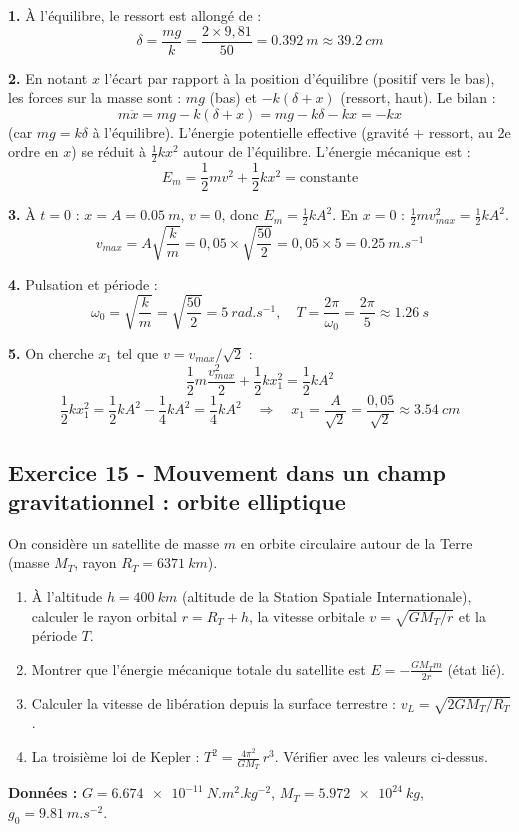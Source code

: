 \documentclass[12pt,a4paper]{article}
\begin{document}
\begin{boitecorrige}
\textbf{1.} À l'équilibre, le ressort est allongé de :
\[
\delta = \frac{mg}{k} = \frac{2\times9{,}81}{50} = \qty{0.392}{m} \approx \qty{39.2}{cm}
\]

\textbf{2.} En notant $x$ l'écart par rapport à la position d'équilibre (positif vers le bas), les forces sur la masse sont : $mg$ (bas) et $-k(\delta+x)$ (ressort, haut). Le bilan :
\[
m\ddot{x} = mg - k(\delta+x) = mg - k\delta - kx = -kx
\]
(car $mg = k\delta$ à l'équilibre). L'énergie potentielle effective (gravité + ressort, au 2e ordre en $x$) se réduit à $\frac{1}{2}kx^2$ autour de l'équilibre. L'énergie mécanique est :
\[
E_m = \frac{1}{2}mv^2 + \frac{1}{2}kx^2 = \text{constante}
\]

\textbf{3.} À $t=0$ : $x = A = \qty{0.05}{m}$, $v = 0$, donc $E_m = \frac{1}{2}kA^2$.
En $x = 0$ : $\frac{1}{2}mv_{max}^2 = \frac{1}{2}kA^2$.
\[
v_{max} = A\sqrt{\frac{k}{m}} = 0{,}05\times\sqrt{\frac{50}{2}} = 0{,}05\times5 = \qty{0.25}{m.s^{-1}}
\]

\textbf{4.} Pulsation et période :
\[
\omega_0 = \sqrt{\frac{k}{m}} = \sqrt{\frac{50}{2}} = \qty{5}{rad.s^{-1}}, \quad T = \frac{2\pi}{\omega_0} = \frac{2\pi}{5} \approx \qty{1.26}{s}
\]

\textbf{5.} On cherche $x_1$ tel que $v = v_{max}/\sqrt{2}$ :
\[
\frac{1}{2}m\frac{v_{max}^2}{2} + \frac{1}{2}kx_1^2 = \frac{1}{2}kA^2
\]
\[
\frac{1}{2}kx_1^2 = \frac{1}{2}kA^2 - \frac{1}{4}kA^2 = \frac{1}{4}kA^2 \quad \Rightarrow \quad x_1 = \frac{A}{\sqrt{2}} = \frac{0{,}05}{\sqrt{2}} \approx \qty{3.54}{cm}
\]
\end{boitecorrige}

\subsection*{Exercice 15 - Mouvement dans un champ gravitationnel : orbite elliptique \niveau{\difficile}}

\begin{boiteexercice}
On considère un satellite de masse $m$ en orbite circulaire autour de la Terre (masse $M_T$, rayon $R_T = \qty{6371}{km}$).
\begin{enumerate}
  \item À l'altitude $h = \qty{400}{km}$ (altitude de la Station Spatiale Internationale), calculer le rayon orbital $r = R_T + h$, la vitesse orbitale $v = \sqrt{GM_T/r}$ et la période $T$.
  \item Montrer que l'énergie mécanique totale du satellite est $E = -\frac{GM_T m}{2r}$ (état lié).
  \item Calculer la vitesse de libération depuis la surface terrestre : $v_L = \sqrt{2GM_T/R_T}$.
  \item La troisième loi de Kepler : $T^2 = \frac{4\pi^2}{GM_T}\,r^3$. Vérifier avec les valeurs ci-dessus.
\end{enumerate}
\textbf{Données :} $G = \qty{6.674e-11}{N.m^2.kg^{-2}}$, $M_T = \qty{5.972e24}{kg}$, $g_0 = \qty{9.81}{m.s^{-2}}$.
\end{boiteexercice}
\end{document}

